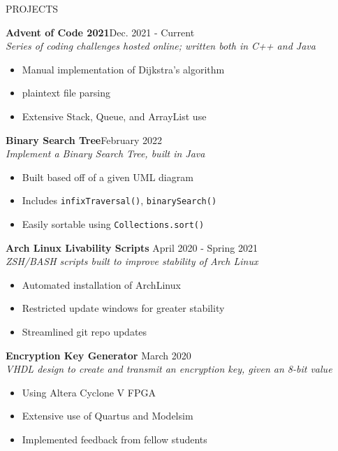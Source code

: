 \documentclass[UTF-8]{resume} \usepackage{multirow}
\begin{document}
\begin{rSection}{PROJECTS}
	\vspace{-1.5em}
\item \textbf{Advent of Code 2021}\hfill {Dec. 2021 - Current}\\
	\emph{Series of coding challenges hosted online; written both in C++ and Java}
	\begin{itemize}
          \itemsep -5pt {}
	       \item Manual implementation of Dijkstra's algorithm
	       \item plaintext file parsing
           \item Extensive Stack, Queue, and ArrayList use
	\end{itemize}
\item \textbf{Binary Search Tree}\hfill {February 2022} \\
    \emph{ Implement a Binary Search Tree, built in Java}
	\begin{itemize}
         \itemsep -5pt {}
	      \item Built based off of a given UML diagram
          \item Includes \verb|infixTraversal()|, \verb|binarySearch()|
          \item Easily sortable using \verb|Collections.sort()|
	\end{itemize}
\item \textbf{Arch Linux Livability Scripts} \hfill {April 2020 - Spring 2021}\\
	\emph{ZSH/BASH scripts built to improve stability of Arch Linux}
	\begin{itemize}
	    \itemsep -5pt {}
             \item Automated installation of ArchLinux
             \item Restricted update windows for greater stability
             \item Streamlined git repo updates
	\end{itemize}
\item \textbf{Encryption Key Generator} \hfill{March 2020}\\
	\emph{VHDL design to create and transmit an encryption key, given an 8-bit value}
       \begin{itemize}
           \itemsep -5pt {}
	        \item Using Altera Cyclone V FPGA
		    \item Extensive use of Quartus and Modelsim
            \item Implemented feedback from fellow students
	\end{itemize}
\end{rSection}
\end{document}
